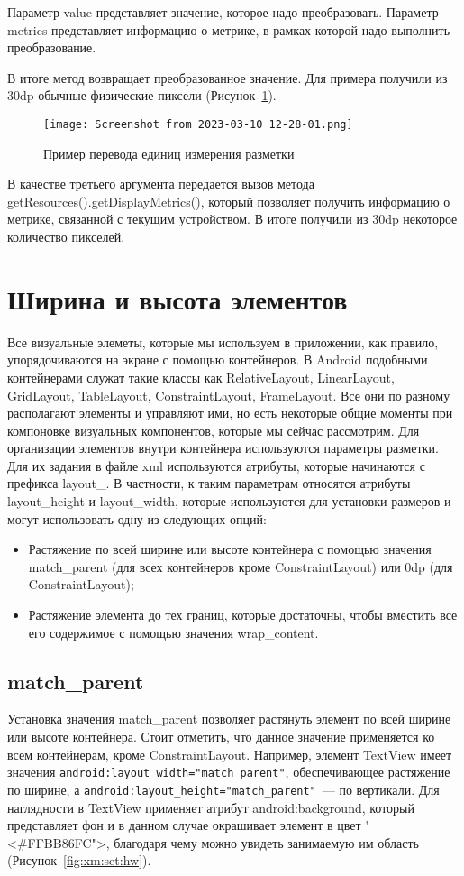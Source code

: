 Параметр value представляет значение, которое надо преобразовать.
Параметр metrics представляет информацию о метрике, в рамках которой
надо выполнить преобразование.\par
В итоге метод возвращает преобразованное значение. 
Для примера получили из 30dp обычные физические пиксели
(Рисунок~\ref{fig:java:applydim}).

\begin{figure}[h!tp]
	\centering
	\texttt{[image: Screenshot from 2023-03-10 12-28-01.png]}
	\caption{Пример перевода единиц измерения разметки}
	\label{fig:java:applydim}
\end{figure}

В качестве третьего аргумента передается вызов метода
getResources().getDisplayMetrics(), который позволяет получить информацию
о метрике, связанной с текущим устройством. В итоге получили из 30dp
некоторое количество пикселей.

\section{Ширина и высота элементов}
Все визуальные элеметы, которые мы используем в приложении, как
правило, упорядочиваются на экране с помощью контейнеров. В Android
подобными контейнерами служат такие классы как RelativeLayout,
LinearLayout, GridLayout, TableLayout, ConstraintLayout, FrameLayout. Все
они по разному располагают элементы и управляют ими, но есть некоторые
общие моменты при компоновке визуальных компонентов, которые мы
сейчас рассмотрим.
Для организации элементов внутри контейнера используются параметры
разметки. Для их задания в файле xml используются атрибуты, которые
начинаются с префикса layout\_. В частности, к таким параметрам относятся
атрибуты layout\_height и layout\_width, которые используются для установки
размеров и могут использовать одну из следующих опций:
\begin{itemize}
	\item Растяжение по всей ширине или высоте контейнера с помощью значения
		match\_parent (для всех контейнеров кроме ConstraintLayout)
		или 0dp (для ConstraintLayout);
	\item Растяжение элемента до тех границ, которые достаточны,
		чтобы вместить все его содержимое с помощью значения wrap\_content.
\end{itemize}

\subsection{match\_parent}
Установка значения match\_parent позволяет растянуть элемент по всей
ширине или высоте контейнера. Стоит отметить, что данное значение
применяется ко всем контейнерам, кроме ConstraintLayout. Например,
элемент TextView имеет значения
\texttt{android:layout\_width="match\_parent"}, обеспечивающее растяжение
по ширине, а \texttt{android:layout\_height="match\_parent"}~--- по вертикали.
Для наглядности в TextView применяет атрибут android:background,
который представляет фон и в данном случае окрашивает элемент
в цвет "<\#FFBB86FC">, благодаря чему можно увидеть занимаемую им область
(Рисунок~\ref{fig:xm:set:hw}).

